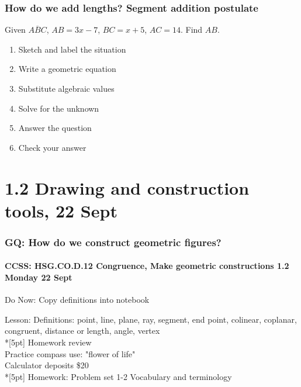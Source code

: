 \documentclass{beamer}
\begin{document}
  \frame
  {
    \frametitle{How do we add lengths? Segment addition postulate}
    
    Given $\overline{ABC}$, $AB=3x-7$, $BC=x+5$, $AC=14$. Find ${AB}$.\\[0.5in]
        \vspace{1cm}
  \begin{enumerate}
      \item<2-> Sketch and label the situation\\
      \item<2-> Write a geometric equation\\
      \item<2-> Substitute algebraic values\\
      \item<2-> Solve for the unknown\\
      \item<2-> Answer the question\\
      \item<2-> Check your answer
    \end{enumerate}
  }

\section{1.2 Drawing and construction tools, 22 Sept}
\frame
{
  \frametitle{GQ: How do we construct geometric figures?}
  \framesubtitle{CCSS: HSG.CO.D.12 Congruence, Make geometric constructions  \hfill \alert{1.2 Monday 22 Sept}}

  \begin{block}{Do Now: Copy definitions into notebook}
  \end{block}
  Lesson: Definitions: point, line, plane, ray, segment, end point, colinear, coplanar, congruent, distance or length, angle, vertex \\*[5pt]
  Homework review\\
  Practice compass use: "flower of life"\\
  Calculator deposits \$20 \\*[5pt]
  Homework: Problem set 1-2 Vocabulary and terminology
}
\end{document}
